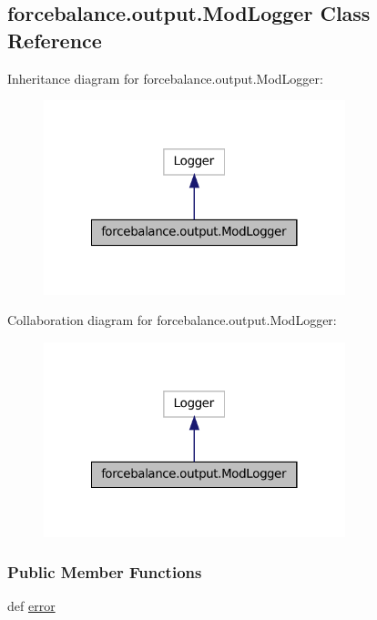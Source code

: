 \hypertarget{classforcebalance_1_1output_1_1ModLogger}{\subsection{forcebalance.\-output.\-Mod\-Logger Class Reference}
\label{classforcebalance_1_1output_1_1ModLogger}
}


Inheritance diagram for forcebalance.\-output.\-Mod\-Logger\-:
\nopagebreak
\begin{figure}[H]
\begin{center}
\leavevmode
\includegraphics[width=248pt]{classforcebalance_1_1output_1_1ModLogger__inherit__graph}
\end{center}
\end{figure}


Collaboration diagram for forcebalance.\-output.\-Mod\-Logger\-:
\nopagebreak
\begin{figure}[H]
\begin{center}
\leavevmode
\includegraphics[width=248pt]{classforcebalance_1_1output_1_1ModLogger__coll__graph}
\end{center}
\end{figure}
\subsubsection*{Public Member Functions}
\begin{DoxyCompactItemize}
\item 
def \hyperlink{classforcebalance_1_1output_1_1ModLogger_acbbf34753c5a40922b0a3434f6046982}{error}
\end{DoxyCompactItemize}


